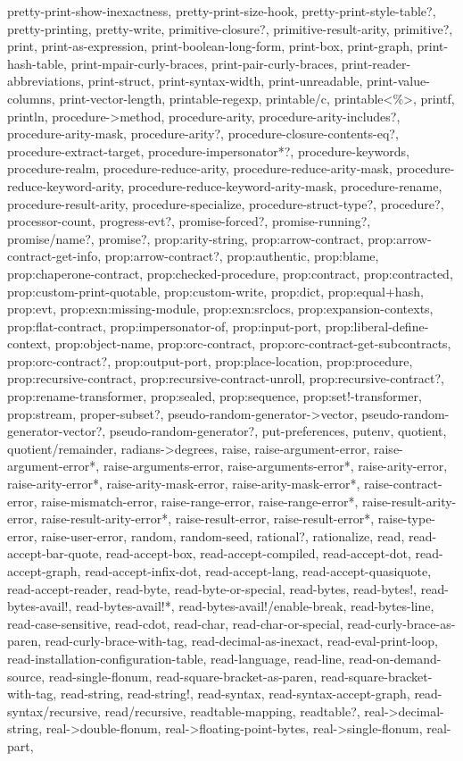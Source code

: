 {{pretty-print-show-inexactness, pretty-print-size-hook, pretty-print-style-table?, pretty-printing, pretty-write, primitive-closure?, primitive-result-arity, primitive?, print, print-as-expression, print-boolean-long-form, print-box, print-graph, print-hash-table, print-mpair-curly-braces, print-pair-curly-braces, print-reader-abbreviations, print-struct, print-syntax-width, print-unreadable, print-value-columns, print-vector-length, printable-regexp, printable/c, printable<\%>, printf, println, procedure->method, procedure-arity, procedure-arity-includes?, procedure-arity-mask, procedure-arity?, procedure-closure-contents-eq?, procedure-extract-target, procedure-impersonator*?, procedure-keywords, procedure-realm, procedure-reduce-arity, procedure-reduce-arity-mask, procedure-reduce-keyword-arity, procedure-reduce-keyword-arity-mask, procedure-rename, procedure-result-arity, procedure-specialize, procedure-struct-type?, procedure?, processor-count, progress-evt?, promise-forced?, promise-running?, promise/name?, promise?, prop:arity-string, prop:arrow-contract, prop:arrow-contract-get-info, prop:arrow-contract?, prop:authentic, prop:blame, prop:chaperone-contract, prop:checked-procedure, prop:contract, prop:contracted, prop:custom-print-quotable, prop:custom-write, prop:dict, prop:equal+hash, prop:evt, prop:exn:missing-module, prop:exn:srclocs, prop:expansion-contexts, prop:flat-contract, prop:impersonator-of, prop:input-port, prop:liberal-define-context, prop:object-name, prop:orc-contract, prop:orc-contract-get-subcontracts, prop:orc-contract?, prop:output-port, prop:place-location, prop:procedure, prop:recursive-contract, prop:recursive-contract-unroll, prop:recursive-contract?, prop:rename-transformer, prop:sealed, prop:sequence, prop:set!-transformer, prop:stream, proper-subset?, pseudo-random-generator->vector, pseudo-random-generator-vector?, pseudo-random-generator?, put-preferences, putenv, quotient, quotient/remainder, radians->degrees, raise, raise-argument-error, raise-argument-error*, raise-arguments-error, raise-arguments-error*, raise-arity-error, raise-arity-error*, raise-arity-mask-error, raise-arity-mask-error*, raise-contract-error, raise-mismatch-error, raise-range-error, raise-range-error*, raise-result-arity-error, raise-result-arity-error*, raise-result-error, raise-result-error*, raise-type-error, raise-user-error, random, random-seed, rational?, rationalize, read, read-accept-bar-quote, read-accept-box, read-accept-compiled, read-accept-dot, read-accept-graph, read-accept-infix-dot, read-accept-lang, read-accept-quasiquote, read-accept-reader, read-byte, read-byte-or-special, read-bytes, read-bytes!, read-bytes-avail!, read-bytes-avail!*, read-bytes-avail!/enable-break, read-bytes-line, read-case-sensitive, read-cdot, read-char, read-char-or-special, read-curly-brace-as-paren, read-curly-brace-with-tag, read-decimal-as-inexact, read-eval-print-loop, read-installation-configuration-table, read-language, read-line, read-on-demand-source, read-single-flonum, read-square-bracket-as-paren, read-square-bracket-with-tag, read-string, read-string!, read-syntax, read-syntax-accept-graph, read-syntax/recursive, read/recursive, readtable-mapping, readtable?, real->decimal-string, real->double-flonum, real->floating-point-bytes, real->single-flonum, real-part, }}
